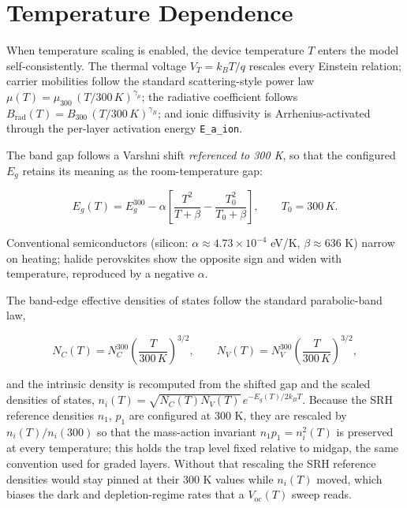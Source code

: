 \documentclass[
  11pt,
  american,
]{report}
\begin{document}
\hypertarget{temperature-dependence}{%
\section{Temperature Dependence}\label{temperature-dependence}}

When temperature scaling is enabled, the device temperature \(T\) enters
the model self-consistently. The thermal voltage \(V_T = k_BT/q\)
rescales every Einstein relation; carrier mobilities follow the standard
scattering-style power law
\(\mu(T) = \mu_{300}\,(T/300\,K)^{\gamma_\mu}\); the radiative
coefficient follows
\(B_\mathrm{rad}(T) = B_{300}\,(T/300\,K)^{\gamma_B}\); and ionic
diffusivity is Arrhenius-activated through the per-layer activation
energy \texttt{E\_a\_ion}.

The band gap follows a Varshni shift \emph{referenced to 300 K}, so that
the configured \(E_g\) retains its meaning as the room-temperature gap:

\begin{equation}
\label{eq:varshni}
E_g(T)
=
E_g^{300}
-\alpha\left[
\frac{T^2}{T+\beta}-\frac{T_0^2}{T_0+\beta}
\right],
\qquad T_0 = 300\,K .
\end{equation}

Conventional semiconductors (silicon:
\(\alpha \approx 4.73\times10^{-4}\) eV/K, \(\beta \approx 636\) K)
narrow on heating; halide perovskites show the opposite sign and widen
with temperature, reproduced by a negative \(\alpha\).

The band-edge effective densities of states follow the standard
parabolic-band law,

\begin{equation}
\label{eq:dos-temperature}
N_C(T)=N_C^{300}\left(\frac{T}{300\,K}\right)^{3/2},
\qquad
N_V(T)=N_V^{300}\left(\frac{T}{300\,K}\right)^{3/2},
\end{equation}

and the intrinsic density is recomputed from the shifted gap and the
scaled densities of states,
\(n_i(T)=\sqrt{N_C(T)N_V(T)}\,e^{-E_g(T)/2k_BT}\). Because the SRH
reference densities \(n_1\), \(p_1\) are configured at 300 K, they are
rescaled by \(n_i(T)/n_i(300)\) so that the mass-action invariant
\(n_1p_1=n_i^2(T)\) is preserved at every temperature; this holds the
trap level fixed relative to midgap, the same convention used for graded
layers. Without that rescaling the SRH reference densities would stay
pinned at their 300 K values while \(n_i(T)\) moved, which biases the
dark and depletion-regime rates that a \(V_\mathrm{oc}(T)\) sweep reads.
\end{document}
